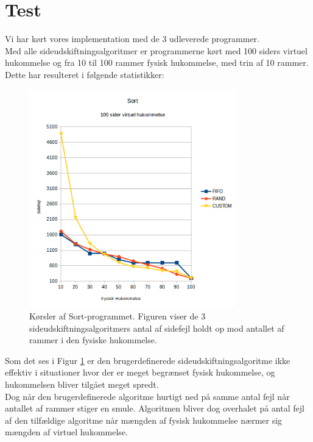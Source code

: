\section{Test}
Vi har kørt vores implementation med de 3 udleverede programmer.\\

Med alle sideudskiftningsalgoritmer er programmerne kørt med 100 siders virtuel hukommelse og fra 10 til 100 rammer fysisk hukommelse, med trin af 10 rammer. Dette har resulteret i følgende statistikker:

\begin{figure}[h]
	\centering
	\includegraphics[width=0.8\textwidth]{figures/SortStatistic.png}
	\caption{Kørsler af Sort-programmet. Figuren viser de 3 sideudskiftningsalgoritmers antal af sidefejl holdt op mod antallet af rammer i den fysiske hukommelse.}
	\label{fig:sortstatistic}
\end{figure}

Som det ses i Figur \ref{fig:sortstatistic} er den brugerdefinerede sideudskiftningsalgoritme ikke effektiv i situationer hvor der er meget begrænset fysisk hukommelse, og hukommelsen bliver tilgået meget spredt.\\

Dog når den brugerdefinerede algoritme hurtigt ned på samme antal fejl når antallet af rammer stiger en smule. Algoritmen bliver dog overhalet på antal fejl af den tilfældige algoritme når mængden af fysisk hukommelse nærmer sig mængden af virtuel hukommelse.\\


